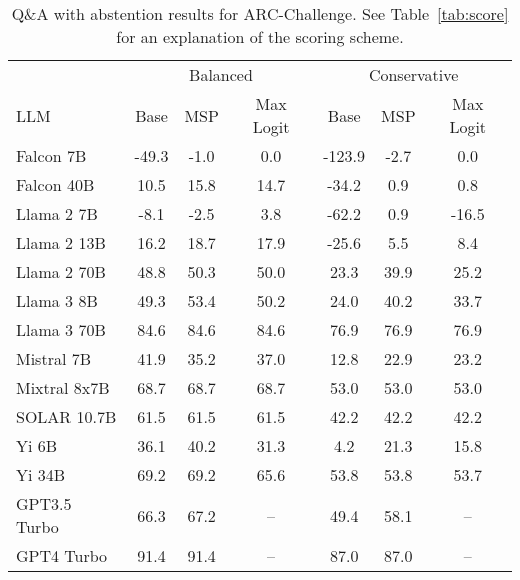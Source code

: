 \begin{table*}[h]
\centering
\caption{Q\&A with abstention results for ARC-Challenge. See Table~\ref{tab:score} for an explanation of the scoring scheme.}
\label{tab:arc_score}
\begin{tabular}{lcccccc}
\toprule
& \multicolumn{3}{c}{Balanced} & \multicolumn{3}{c}{Conservative} \\ 
LLM & Base & MSP & Max Logit & Base & MSP & Max Logit \\ 
\cmidrule(lr){1-1}\cmidrule(lr){2-4}\cmidrule(lr){5-7} 
Falcon 7B & -49.3 & -1.0 & 0.0 & -123.9 & -2.7 & 0.0\\
Falcon 40B & 10.5 & 15.8 & 14.7 & -34.2 & 0.9 & 0.8\\
Llama 2 7B & -8.1 & -2.5 & 3.8 & -62.2 & 0.9 & -16.5\\
Llama 2 13B & 16.2 & 18.7 & 17.9 & -25.6 & 5.5 & 8.4\\
Llama 2 70B & 48.8 & 50.3 & 50.0 & 23.3 & 39.9 & 25.2\\
Llama 3 8B & 49.3 & 53.4 & 50.2 & 24.0 & 40.2 & 33.7\\
Llama 3 70B & 84.6 & 84.6 & 84.6 & 76.9 & 76.9 & 76.9\\
Mistral 7B & 41.9 & 35.2 & 37.0 & 12.8 & 22.9 & 23.2\\
Mixtral 8x7B & 68.7 & 68.7 & 68.7 & 53.0 & 53.0 & 53.0\\
SOLAR 10.7B & 61.5 & 61.5 & 61.5 & 42.2 & 42.2 & 42.2\\
Yi 6B & 36.1 & 40.2 & 31.3 & 4.2 & 21.3 & 15.8\\
Yi 34B & 69.2 & 69.2 & 65.6 & 53.8 & 53.8 & 53.7\\
GPT3.5 Turbo & 66.3 & 67.2 & -- & 49.4 & 58.1 & --\\
GPT4 Turbo & 91.4 & 91.4 & -- & 87.0 & 87.0 & --\\
\bottomrule
\end{tabular}
\end{table*}
